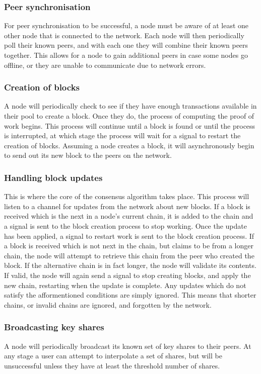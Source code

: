 \documentclass[a4paper,12pt]{article}
\begin{document}
\subsubsection{Peer synchronisation}
For peer synchronisation to be successful, a node must be aware of at least one other node that is connected to the network. Each node will then periodically poll their known peers, and with each one they will combine their known peers together. This allows for a node to gain additional peers in case some nodes go offline, or they are unable to communicate due to network errors.

\subsubsection{Creation of blocks}
A node will periodically check to see if they have enough transactions available in their pool to create a block. Once they do, the process of computing the proof of work begins. This process will continue until a block is found or until the process is interrupted, at which stage the process will wait for a signal to restart the creation of blocks. Assuming a node creates a block, it will asynchronously begin to send out its new block to the peers on the network.

\subsubsection{Handling block updates}
This is where the core of the consensus algorithm takes place. This process will listen to a channel for updates from the network about new blocks. If a block is received which is the next in a node's current chain, it is added to the chain and a signal is sent to the block creation process to stop working. Once the update has been applied, a signal to restart work is sent to the block creation process. If a block is received which is not next in the chain, but claims to be from a longer chain, the node will attempt to retrieve this chain from the peer who created the block. If the alternative chain is in fact longer, the node will validate its contents. If valid, the node will again send a signal to stop creating blocks, and apply the new chain, restarting when the update is complete. Any updates which do not satisfy the afformentioned conditions are simply ignored. This means that shorter chains, or invalid chains are ignored, and forgotten by the network.

\subsubsection{Broadcasting key shares}
A node will periodically broadcast its known set of key shares to their peers. At any stage a user can attempt to interpolate a set of shares, but will be unsuccessful unless they have at least the threshold number of shares.
\end{document}
